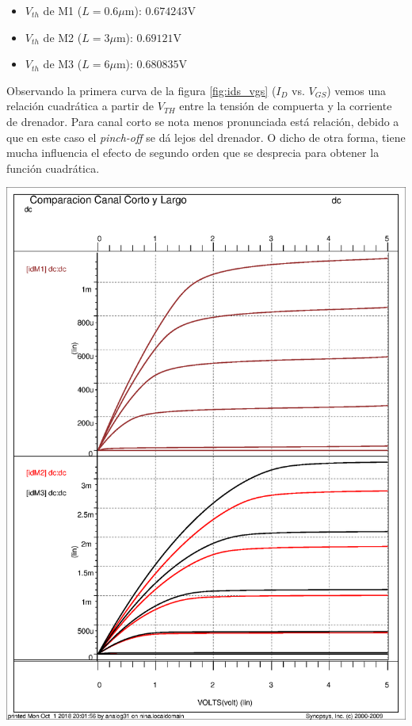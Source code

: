 \begin{itemize}
	\item $V_{th}$ de M1 ($L=0.6\mu$m): $0.674243$V
	\item $V_{th}$ de M2 ($L=3\mu$m): $0.69121$V
	\item $V_{th}$ de M3 ($L=6\mu$m): $0.680835$V
\end{itemize}

Observando la primera curva de la figura \ref{fig:ids_vgs} ($I_D$ vs. $V_{GS}$) vemos una relación cuadrática a partir de $V_{TH}$ entre la tensión de compuerta y la corriente de drenador. Para canal corto se nota menos pronunciada está relación, debido a que en este caso el \emph{pinch-off} se dá lejos del drenador. O dicho de otra forma, tiene mucha influencia el efecto de segundo orden que se desprecia para obtener la función cuadrática. 







\vspace{0.3cm}
\includegraphics[scale=0.7]{images/parametric}






